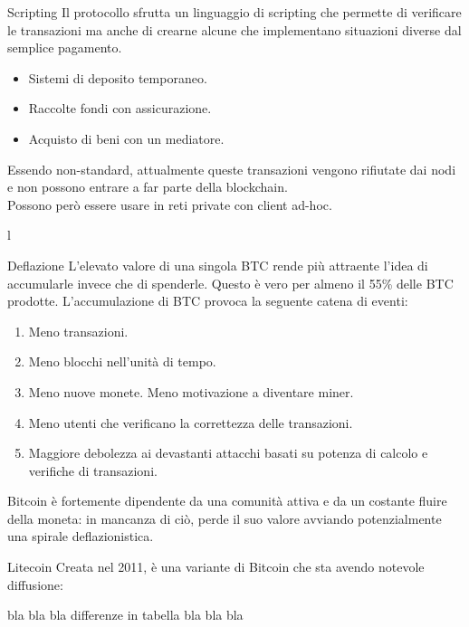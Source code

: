 \documentclass[italian]{beamer}
\begin{document}
\begin{frame}{Scripting}
Il protocollo sfrutta un linguaggio di scripting che permette di verificare le transazioni ma anche di crearne alcune che implementano situazioni diverse dal semplice pagamento.
\begin{itemize}
\item Sistemi di deposito temporaneo.
\item Raccolte fondi con assicurazione.
\item Acquisto di beni con un mediatore.
\end{itemize}
\bigskip
\pause
Essendo non-standard, attualmente queste transazioni vengono rifiutate dai nodi e non possono entrare a far parte della blockchain.\\
Possono però essere usare in reti private con client ad-hoc.
\end{frame}l

\begin{frame}{Deflazione}
 L'elevato valore di una singola BTC rende più attraente l'idea di accumularle invece che di spenderle. Questo è vero per almeno il 55\% delle BTC prodotte. L'accumulazione di BTC provoca la seguente catena di eventi:
 \begin{enumerate}
  \item Meno transazioni. \puase
  \item Meno blocchi nell'unità di tempo. \puase
  \item Meno nuove monete. \puase
  \imte Meno motivazione a diventare miner. \puase
  \item Meno utenti che verificano la correttezza delle transazioni. \puase
  \item Maggiore debolezza ai devastanti attacchi basati su potenza di calcolo e verifiche di transazioni. \puase
 \end{enumerate}
 Bitcoin è fortemente dipendente da una comunità attiva e da un costante fluire della moneta: in mancanza di ciò, perde il suo valore avviando potenzialmente una spirale deflazionistica.
\end{frame}

\begin{frame}{Litecoin}
  Creata nel 2011, è una variante di Bitcoin che sta avendo notevole diffusione:
  
  bla bla bla differenze in tabella bla bla bla
\end{frame}
\end{document}
